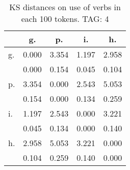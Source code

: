 \begin{table}[h!]
\begin{center}
\begin{tabular}{| l | c | c | c | c |}\hline
 & g. & p. & i. & h. \\\hline
g. & 0.000  & 3.354  & 1.197  & 2.958 \\\hline
 & 0.000  & 0.154  & 0.045  & 0.104 \\\hline
p. & 3.354  & 0.000  & 2.543  & 5.053 \\\hline
 & 0.154  & 0.000  & 0.134  & 0.259 \\\hline
i. & 1.197  & 2.543  & 0.000  & 3.221 \\\hline
 & 0.045  & 0.134  & 0.000  & 0.140 \\\hline
h. & 2.958  & 5.053  & 3.221  & 0.000 \\\hline
 & 0.104  & 0.259  & 0.140  & 0.000 \\\hline
\end{tabular}
\caption{KS distances on use of verbs in each 100 tokens. TAG: 4}
\end{center}
\end{table}